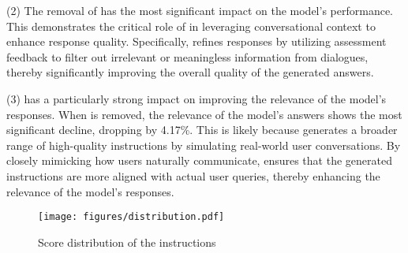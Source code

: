(2) The removal of \convrefine has the most significant impact on the model's performance. This demonstrates the critical role of \convrefine in leveraging conversational context to enhance response quality. Specifically, \convrefine refines responses by utilizing assessment feedback to filter out irrelevant or meaningless information from dialogues, thereby significantly improving the overall quality of the generated answers.

(3) \convaugment has a particularly strong impact on improving the relevance of the model's responses. When \convaugment is removed, the relevance of the model's answers shows the most significant decline, dropping by 4.17\%. This is likely because \convaugment generates a broader range of high-quality instructions by simulating real-world user conversations. By closely mimicking how users naturally communicate, \convaugment ensures that the generated instructions are more aligned with actual user queries, thereby enhancing the relevance of the model's responses.


\begin{figure}[!t]
\centering
\texttt{[image: figures/distribution.pdf]}
    \caption{Score distribution of the instructions}
    \label{fig:scoreDist}
\end{figure}

